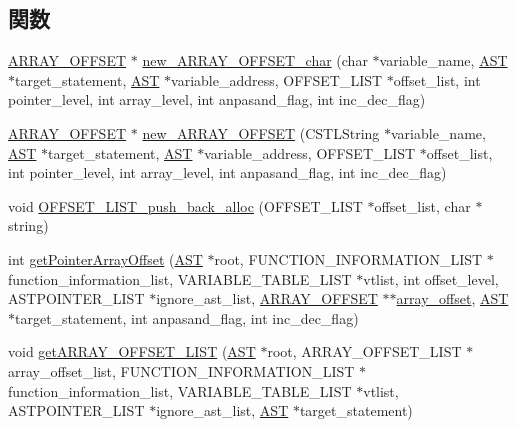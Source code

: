 \subsection*{関数}
\begin{DoxyCompactItemize}
\item 
\hyperlink{structarray__offset}{ARRAY\_\-OFFSET} $\ast$ \hyperlink{PointerArrayControl_8h_ad39591d4757bb4a1cbb2e982e031aa0c}{new\_\-ARRAY\_\-OFFSET\_\-char} (char $\ast$variable\_\-name, \hyperlink{structabstract__syntax__tree}{AST} $\ast$target\_\-statement, \hyperlink{structabstract__syntax__tree}{AST} $\ast$variable\_\-address, OFFSET\_\-LIST $\ast$offset\_\-list, int pointer\_\-level, int array\_\-level, int anpasand\_\-flag, int inc\_\-dec\_\-flag)
\item 
\hyperlink{structarray__offset}{ARRAY\_\-OFFSET} $\ast$ \hyperlink{PointerArrayControl_8h_a3c19acc973d7d77775aab6be9a51c6c0}{new\_\-ARRAY\_\-OFFSET} (CSTLString $\ast$variable\_\-name, \hyperlink{structabstract__syntax__tree}{AST} $\ast$target\_\-statement, \hyperlink{structabstract__syntax__tree}{AST} $\ast$variable\_\-address, OFFSET\_\-LIST $\ast$offset\_\-list, int pointer\_\-level, int array\_\-level, int anpasand\_\-flag, int inc\_\-dec\_\-flag)
\item 
void \hyperlink{PointerArrayControl_8h_a1fe4a503769616086f897aa93a66f5a7}{OFFSET\_\-LIST\_\-push\_\-back\_\-alloc} (OFFSET\_\-LIST $\ast$offset\_\-list, char $\ast$string)
\item 
int \hyperlink{PointerArrayControl_8h_a93c403617815b6a7d28fc18dd28d0ab8}{getPointerArrayOffset} (\hyperlink{structabstract__syntax__tree}{AST} $\ast$root, FUNCTION\_\-INFORMATION\_\-LIST $\ast$function\_\-information\_\-list, VARIABLE\_\-TABLE\_\-LIST $\ast$vtlist, int offset\_\-level, ASTPOINTER\_\-LIST $\ast$ignore\_\-ast\_\-list, \hyperlink{structarray__offset}{ARRAY\_\-OFFSET} $\ast$$\ast$\hyperlink{structarray__offset}{array\_\-offset}, \hyperlink{structabstract__syntax__tree}{AST} $\ast$target\_\-statement, int anpasand\_\-flag, int inc\_\-dec\_\-flag)
\item 
void \hyperlink{PointerArrayControl_8h_a8c3eadc0355b2748c489ded072531764}{getARRAY\_\-OFFSET\_\-LIST} (\hyperlink{structabstract__syntax__tree}{AST} $\ast$root, ARRAY\_\-OFFSET\_\-LIST $\ast$array\_\-offset\_\-list, FUNCTION\_\-INFORMATION\_\-LIST $\ast$function\_\-information\_\-list, VARIABLE\_\-TABLE\_\-LIST $\ast$vtlist, ASTPOINTER\_\-LIST $\ast$ignore\_\-ast\_\-list, \hyperlink{structabstract__syntax__tree}{AST} $\ast$target\_\-statement)
\item 
$$
\end{DoxyCompactItemize}
